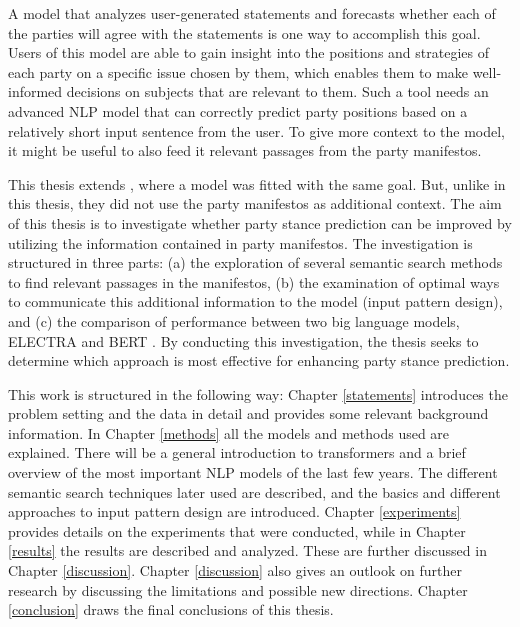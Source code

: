 A model that analyzes user-generated statements and forecasts whether each of the parties will agree with the statements is one way to accomplish this goal. Users of this model are able to gain insight into the positions and strategies of each party on a specific issue chosen by them, which enables them to make well-informed decisions on subjects that are relevant to them. Such a tool needs an advanced NLP model that can correctly predict party positions based on a relatively short input sentence from the user. To give more context to the model, it might be useful to also feed it relevant passages from the party manifestos.

This thesis extends \citet{witte_2022}, where a model was fitted with the same goal. But, unlike in this thesis, they did not use the party manifestos as additional context. The aim of this thesis is to investigate whether party stance prediction can be improved by utilizing the information contained in party manifestos. The investigation is structured in three parts: (a) the exploration of several semantic search methods to find relevant passages in the manifestos, (b) the examination of optimal ways to communicate this additional information to the model (input pattern design), and (c) the comparison of performance between two big language models, ELECTRA \citep{clark2020electra} and BERT \citep{devlin2018bert}. By conducting this investigation, the thesis seeks to determine which approach is most effective for enhancing party stance prediction.

This work is structured in the following way: Chapter \ref{statements} introduces the problem setting and the data in detail and provides some relevant background information. In Chapter \ref{methods} all the models and methods used are explained. There will be a general introduction to transformers and a brief overview of the most important NLP models of the last few years. The different semantic search techniques later used are described, and the basics and different approaches to input pattern design are introduced. Chapter \ref{experiments} provides details on the experiments that were conducted, while in Chapter \ref{results} the results are described and analyzed. These are further discussed in Chapter \ref{discussion}. Chapter \ref{discussion} also gives an outlook on further research by discussing the limitations and possible new directions. Chapter \ref{conclusion} draws the final conclusions of this thesis.